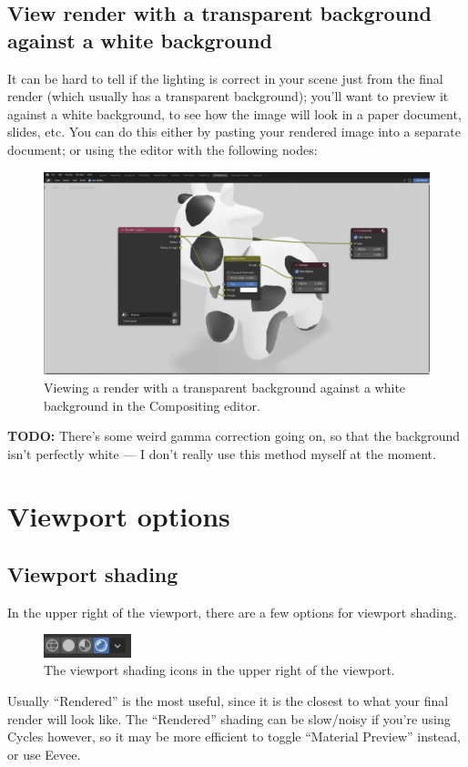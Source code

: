 \documentclass[10pt]{article}
\begin{document}
\subsection{View render with a transparent background against a white background}
\label{sec:preview_with_white_background}
It can be hard to tell if the lighting is correct in your scene just from the final render (which usually has a transparent background); you'll want to preview it against a white background, to see how the image will look in a paper document, slides, etc. You can do this either by pasting your rendered image into a separate document; or using the  editor with the following nodes:
\begin{figure}[H]
    \centering
    \captionsetup{width=0.8\textwidth}
    \includegraphics[width=6in]{images/2022-09-07_preview-in-compositor.png}
    \caption{Viewing a render with a transparent background against a white background in the Compositing editor.}
\end{figure}
{\bf TODO:} There's some weird gamma correction going on, so that the background isn't perfectly white --- I don't really use this method myself at the moment.

\section{Viewport options}

\subsection{Viewport shading}
\label{sec:viewport_shading}

In the upper right of the viewport, there are a few options for viewport shading. 
\begin{figure}[H]
    \centering
    \captionsetup{width=0.8\textwidth}
    \includegraphics[width=1in]{images/2022-09-07_viewport-shading-options.png}
    \caption{The viewport shading icons in the upper right of the viewport.}
\end{figure}
Usually ``Rendered'' is the most useful, since it is the closest to what your final render will look like. The ``Rendered'' shading can be slow/noisy if you're using Cycles however, so it may be more efficient to toggle ``Material Preview'' instead, or use Eevee.
\end{document}
